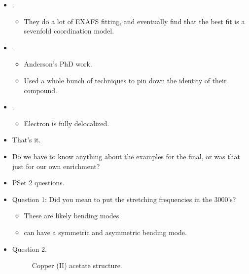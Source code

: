 \documentclass[../notes.tex]{subfiles}
\begin{document}
\begin{itemize}
\begin{itemize}
        \item First up: UV-Vis. One of the hallmarks is green color, and Rittle found this and was very excited.
        \item Mossbauer: At \SI{4}{\kelvin}, you get magnetic splitting.
        \item EPR: Gives more info on where an electron is in an enzymatic environment.
    \end{itemize}
    \item \textcite{bib:Coord7EXAFS}.
    \begin{itemize}
        \item They do a lot of EXAFS fitting, and eventually find that the best fit is a sevenfold coordination model.
    \end{itemize}
    \item \textcite{bib:AndersonPhD}.
    \begin{itemize}
        \item Anderson's PhD work.
        \item Used a whole bunch of techniques to pin down the identity of their compound.
    \end{itemize}
    \item \textcite{bib:EDelocal}.
    \begin{itemize}
        \item Electron is fully delocalized.
    \end{itemize}
    \item That's it.
    \item Do we have to know anything about the examples for the final, or was that just for our own enrichment?
    \item PSet 2 questions.
    \item Question 1: Did you mean to put the  stretching frequencies in the 3000's?
    \begin{itemize}
        \item These are likely bending modes.
        \item {} can have a symmetric and asymmetric bending mode.
    \end{itemize}
    \item Question 2.
    \begin{figure}[H]
        \centering
        \footnotesize
        \caption{Copper (II) acetate structure.}
        \label{fig:CuOAcStruct}
    \end{figure}

\end{itemize}
\end{document}
